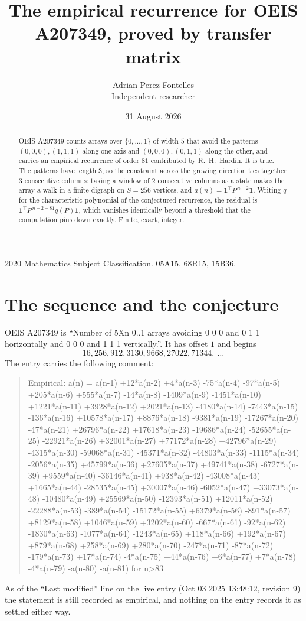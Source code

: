 \documentclass[11pt,a4paper]{article}
\title{The empirical recurrence for OEIS A207349, proved by transfer matrix}
\author{Adrian Perez Fontelles\\ \small Independent researcher}
\date{31 August 2026}
\theoremstyle{plain}
\theoremstyle{definition}
\begin{document}
\maketitle

\begin{abstract}
OEIS A207349 counts arrays over $\{0,\dots,1\}$ of width $5$ that avoid the patterns
$(0,0,0), (1,1,1)$ along one axis and $(0,0,0), (0,1,1)$ along the other, and carries an empirical recurrence of
order $81$ contributed by R.~H.~Hardin. It is true. The patterns have length $3$, so
the constraint across the growing direction ties together $3$ consecutive columns: taking a
window of $2$ consecutive columns as a state makes the array a walk in a finite digraph
on $S=256$ vertices, and $a(n)=\mathbf{1}^{\!\top}P^{\,n-2}\mathbf{1}$. Writing $q$
for the characteristic polynomial of the conjectured recurrence, the residual is
$\mathbf{1}^{\!\top}P^{\,n-2-81}q(P)\mathbf{1}$, which vanishes identically
beyond a threshold that the computation pins down exactly. Finite, exact, integer.
\end{abstract}

\noindent\small 2020 Mathematics Subject Classification. 05A15, 68R15, 15B36.\normalsize

\section{The sequence and the conjecture}

OEIS A207349 is ``Number of 5Xn 0..1 arrays avoiding 0 0 0 and 0 1 1 horizontally and 0 0 0 and 1 1 1 vertically.''. It has offset
$1$ and begins
\[
16, 256, 912, 3130, 9668, 27022, 71344,\ \dots
\]
The entry carries the following comment:
\begin{quote}\small
Empirical: a(n) = a(n-1) +12*a(n-2) +4*a(n-3) -75*a(n-4) -97*a(n-5) +205*a(n-6) +555*a(n-7) -14*a(n-8) -1409*a(n-9) -1451*a(n-10) +1221*a(n-11) +3928*a(n-12) +2021*a(n-13) -4180*a(n-14) -7443*a(n-15) -136*a(n-16) +10578*a(n-17) +8876*a(n-18) -9381*a(n-19) -17267*a(n-20) -47*a(n-21) +26796*a(n-22) +17618*a(n-23) -19686*a(n-24) -52655*a(n-25) -22921*a(n-26) +32001*a(n-27) +77172*a(n-28) +42796*a(n-29) -4315*a(n-30) -59068*a(n-31) -45371*a(n-32) -44803*a(n-33) -1115*a(n-34) -2056*a(n-35) +45799*a(n-36) +27605*a(n-37) +49741*a(n-38) -6727*a(n-39) +9559*a(n-40) -36146*a(n-41) +938*a(n-42) -43008*a(n-43) +1665*a(n-44) -28535*a(n-45) +30007*a(n-46) -6052*a(n-47) +33073*a(n-48) -10480*a(n-49) +25569*a(n-50) -12393*a(n-51) +12011*a(n-52) -22288*a(n-53) -389*a(n-54) -15172*a(n-55) +6379*a(n-56) -891*a(n-57) +8129*a(n-58) +1046*a(n-59) +3202*a(n-60) -667*a(n-61) -92*a(n-62) -1830*a(n-63) -1077*a(n-64) -1243*a(n-65) +118*a(n-66) +192*a(n-67) +879*a(n-68) +258*a(n-69) +280*a(n-70) -247*a(n-71) -87*a(n-72) -179*a(n-73) +17*a(n-74) -4*a(n-75) +44*a(n-76) +6*a(n-77) +7*a(n-78) -4*a(n-79) -a(n-80) -a(n-81) for n>83
\end{quote}
As of the ``Last modified'' line on the live entry (Oct 03 2025 13:48:12, revision
9) the statement is still recorded as empirical, and nothing on the entry
records it as settled either way.
\end{document}
